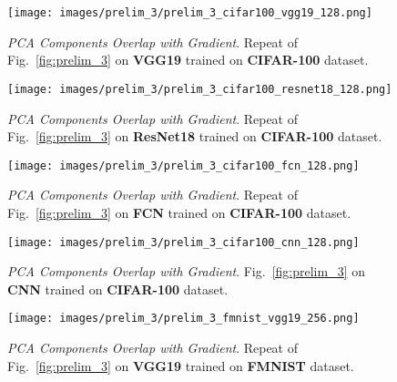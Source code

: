 
\begin{figure}[h!]
  \centering
  \centerline{\texttt{[image: images/prelim\_3/prelim\_3\_cifar100\_vgg19\_128.png]}}
  \caption{\small{\textit{PCA Components Overlap with Gradient}. Repeat of Fig.~\ref{fig:prelim_3} on \textbf{VGG19} trained on \textbf{CIFAR-100} dataset.}}
  \label{fig:prelim_3_cifar100_vgg19}
\end{figure}

\begin{figure}[h!]
  \centering
  \centerline{\texttt{[image: images/prelim\_3/prelim\_3\_cifar100\_resnet18\_128.png]}}
  \caption{\small{\textit{PCA Components Overlap with Gradient}. Repeat of Fig.~\ref{fig:prelim_3} on \textbf{ResNet18} trained on \textbf{CIFAR-100} dataset.}}
  \label{fig:prelim_3_cifar100_resnet18}
\end{figure}

\begin{figure}[h!]
  \centering
  \centerline{\texttt{[image: images/prelim\_3/prelim\_3\_cifar100\_fcn\_128.png]}}
  \caption{\small{\textit{PCA Components Overlap with Gradient}. Repeat of Fig.~\ref{fig:prelim_3} on \textbf{FCN} trained on \textbf{CIFAR-100} dataset.}}
  \label{fig:prelim_3_cifar100_fcn}
\end{figure}

\begin{figure}[h!]
  \centering
  \centerline{\texttt{[image: images/prelim\_3/prelim\_3\_cifar100\_cnn\_128.png]}}
  \caption{\small{\textit{PCA Components Overlap with Gradient}. Fig.~\ref{fig:prelim_3} on \textbf{CNN} trained on \textbf{CIFAR-100} dataset.}}
  \label{fig:prelim_3_cifar100_cnn}
\end{figure}



\begin{figure}[h!]
  \centering
  \centerline{\texttt{[image: images/prelim\_3/prelim\_3\_fmnist\_vgg19\_256.png]}}
  \caption{\small{\textit{PCA Components Overlap with Gradient}. Repeat of Fig.~\ref{fig:prelim_3} on \textbf{VGG19} trained on \textbf{FMNIST} dataset.}}
  \label{fig:prelim_3_fmnist_vgg19}
\end{figure}


